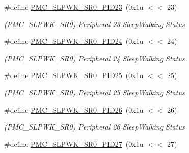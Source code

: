 \begin{DoxyCompactItemize}
\mbox{\label{group__SAMV71__PMC_ga81ac1e46ee8c5b920e9b400ef630c459}} 
\#define \mbox{\hyperlink{group__SAMV71__PMC_ga81ac1e46ee8c5b920e9b400ef630c459}{P\+M\+C\+\_\+\+S\+L\+P\+W\+K\+\_\+\+S\+R0\+\_\+\+P\+I\+D23}}~(0x1u $<$$<$ 23)
\begin{DoxyCompactList}\small\item\em (P\+M\+C\+\_\+\+S\+L\+P\+W\+K\+\_\+\+S\+R0) Peripheral 23 Sleep\+Walking Status \end{DoxyCompactList}\item 
\mbox{\label{group__SAMV71__PMC_ga9489805fde5c17ca52b5cecbe55b2b8b}} 
\#define \mbox{\hyperlink{group__SAMV71__PMC_ga9489805fde5c17ca52b5cecbe55b2b8b}{P\+M\+C\+\_\+\+S\+L\+P\+W\+K\+\_\+\+S\+R0\+\_\+\+P\+I\+D24}}~(0x1u $<$$<$ 24)
\begin{DoxyCompactList}\small\item\em (P\+M\+C\+\_\+\+S\+L\+P\+W\+K\+\_\+\+S\+R0) Peripheral 24 Sleep\+Walking Status \end{DoxyCompactList}\item 
\mbox{\label{group__SAMV71__PMC_ga7e24a1f1f3d0136da4d8c6b22c6e3383}} 
\#define \mbox{\hyperlink{group__SAMV71__PMC_ga7e24a1f1f3d0136da4d8c6b22c6e3383}{P\+M\+C\+\_\+\+S\+L\+P\+W\+K\+\_\+\+S\+R0\+\_\+\+P\+I\+D25}}~(0x1u $<$$<$ 25)
\begin{DoxyCompactList}\small\item\em (P\+M\+C\+\_\+\+S\+L\+P\+W\+K\+\_\+\+S\+R0) Peripheral 25 Sleep\+Walking Status \end{DoxyCompactList}\item 
\mbox{\label{group__SAMV71__PMC_ga7a175554db3d8af248c9e9b39b12d96b}} 
\#define \mbox{\hyperlink{group__SAMV71__PMC_ga7a175554db3d8af248c9e9b39b12d96b}{P\+M\+C\+\_\+\+S\+L\+P\+W\+K\+\_\+\+S\+R0\+\_\+\+P\+I\+D26}}~(0x1u $<$$<$ 26)
\begin{DoxyCompactList}\small\item\em (P\+M\+C\+\_\+\+S\+L\+P\+W\+K\+\_\+\+S\+R0) Peripheral 26 Sleep\+Walking Status \end{DoxyCompactList}\item 
\mbox{\label{group__SAMV71__PMC_ga9f64b43b4a4f49e0a4a4f4f4d6fa86ee}} 
\#define \mbox{\hyperlink{group__SAMV71__PMC_ga9f64b43b4a4f49e0a4a4f4f4d6fa86ee}{P\+M\+C\+\_\+\+S\+L\+P\+W\+K\+\_\+\+S\+R0\+\_\+\+P\+I\+D27}}~(0x1u $<$$<$ 27)
$$
\end{DoxyCompactItemize}
